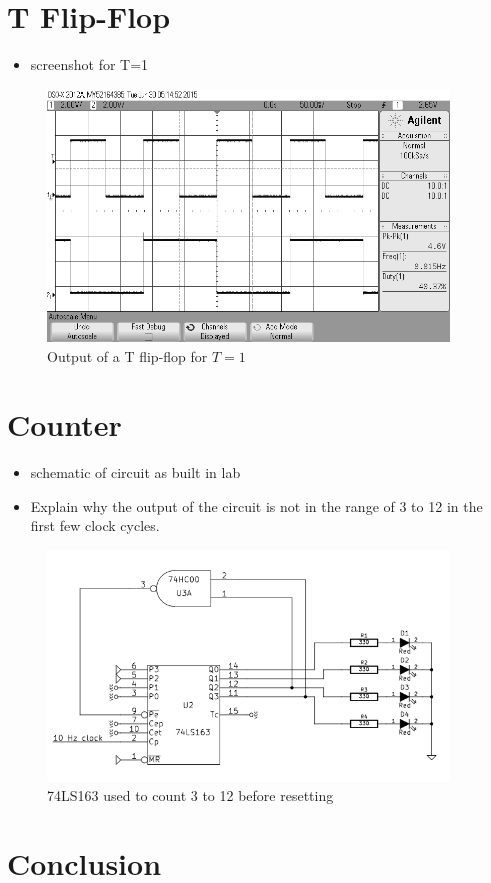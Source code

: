 \documentclass[11pt]{article}
\begin{document}
\section{T Flip-Flop}
\begin{itemize}
	\item screenshot for T=1
\end{itemize}

\begin{figure}[htpb]
	\centering
	\includegraphics[width=0.95\textwidth]{t-ff}
	\caption{Output of a T flip-flop for $T=1$}
	\label{fig:t-ff}
\end{figure}

\section{Counter}
\begin{itemize}
	\item schematic of circuit as built in lab
	\item Explain why the output of the circuit is not in the range of 3 to 12 in the first few clock cycles.
\end{itemize}

\begin{figure}[htpb]
	\centering
	\includegraphics[width=0.95\textwidth]{schematic_counter}
	\caption{74LS163 used to count 3 to 12 before resetting}
	\label{fig:counter}
\end{figure}

\section{Conclusion}
\end{document}
